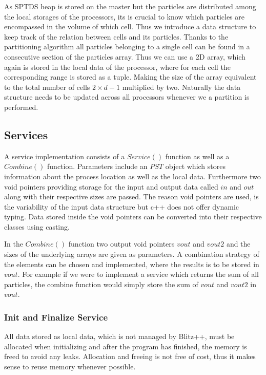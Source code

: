 \documentclass[]{article}
\begin{document}
As SPTDS heap is stored on the master but the particles are distributed among the local storages of the processors, its is crucial to know which particles are encompassed in the volume of which cell. Thus we introduce a data structure to keep track of the relation between cells and its particles. 
Thanks to the partitioning algorithm all particles belonging to a single cell can be found in a consecutive section of the particles array. Thus we can use a 2D array, which again is stored in the local data of the processor, where for each cell the corresponding range is stored as a tuple. Making the size of the array equivalent to the total number of cells $2 \times d -1$ multiplied by two. Naturally the data structure needs to be updated across all processors whenever we a partition is performed.

\subsection{Services}\label{services}

A service implementation consists of a $Service()$ function as well as a $Combine()$ function. Parameters include an $PST$ object which stores information about the process location as well as the local data. Furthermore two void pointers providing storage for the input and output data called $in$ and $out$ along with their respective sizes are passed. The reason void pointers are used, is the variability of the input data structure but c++ does not offer dynamic typing. Data stored inside the void pointers can be converted into their respective classes using casting. 

In the $Combine()$ function two output void pointers $vout$ and $vout2$ and the sizes of the underlying arrays are given as parameters. A combination strategy of the elements can be chosen and implemented, where the results is to be stored in $vout$. For example if we were to implement a service which returns the sum of all particles, the combine function would simply store the sum of $vout$ and $vout2$ in $vout$.

\subsubsection{Init and Finalize Service}

All data stored as local data, which is not managed by Blitz++, must be allocated when initializing and after the program has finished, the memory is freed to avoid any leaks. Allocation and freeing is not free of cost, thus it makes sense to reuse memory whenever possible. 
\end{document}
